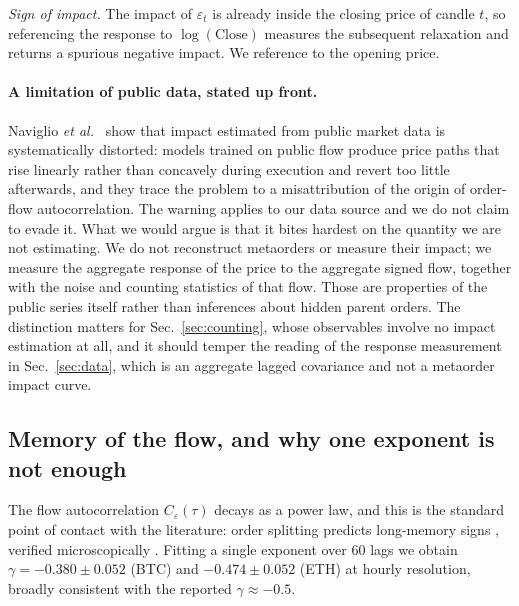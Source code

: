\documentclass[aps,pre,twocolumn,superscriptaddress,floatfix,nofootinbib]{revtex4-2}
\newcommand{\eps}{\varepsilon}
\begin{document}
\emph{Sign of impact.} The impact of $\eps_t$ is already inside the closing
price of candle $t$, so referencing the response to $\log(\text{Close})$
measures the subsequent relaxation and returns a spurious negative impact. We
reference to the opening price.

\paragraph*{A limitation of public data, stated up front.}
Naviglio \textit{et al.}\ \cite{naviglio2025} show that impact estimated from
public market data is systematically distorted: models trained on public flow
produce price paths that rise linearly rather than concavely during execution
and revert too little afterwards, and they trace the problem to a
misattribution of the origin of order-flow autocorrelation. The warning applies
to our data source and we do not claim to evade it. What we would argue is that
it bites hardest on the quantity we are not estimating. We do not reconstruct
metaorders or measure their impact; we measure the aggregate response of the
price to the aggregate signed flow, together with the noise and counting
statistics of that flow. Those are properties of the public series itself
rather than inferences about hidden parent orders. The distinction matters for
Sec.~\ref{sec:counting}, whose observables involve no impact estimation at all,
and it should temper the reading of the response measurement in
Sec.~\ref{sec:data}, which is an aggregate lagged covariance and not a
metaorder impact curve.

\subsection{Memory of the flow, and why one exponent is not enough}
\label{sec:acf}

The flow autocorrelation $C_\eps(\tau)$ decays as a power law, and this is the
standard point of contact with the literature: order splitting predicts
long-memory signs \cite{lillo2005}, verified microscopically
\cite{sato2023prl,sato2023prr}. Fitting a single exponent over $60$ lags we
obtain $\gamma = -0.380 \pm 0.052$ (BTC) and $-0.474 \pm 0.052$ (ETH) at hourly
resolution, broadly consistent with the reported $\gamma\approx-0.5$.
\end{document}
